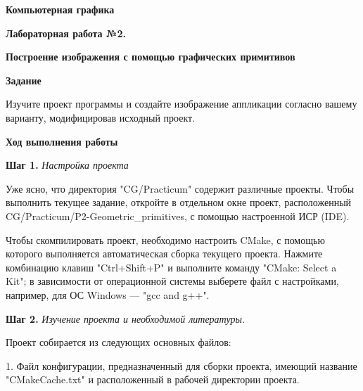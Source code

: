 \documentclass[a4paper,12pt]{article}
\begin{document}
\begin{center}
    \textbf{{\Large Компьютерная графика}}
    
    \textbf{{\large Лабораторная работа №2. }}
    
    \textbf{{\large Построение изображения с помощью графических примитивов}}
    \end{center}
    
    
    \textbf{Задание}
    
    Изучите проект программы и создайте изображение аппликации согласно вашему варианту, модифицировав исходный проект.
    
    
    
    \textbf{Ход выполнения работы}
    
    \textbf{Шаг 1.} \textit{Настройка проекта}
    
    Уже ясно, что директория "CG/Practicum" содержит различные проекты. Чтобы выполнить текущее задание, откройте в отдельном окне проект, расположенный CG/Practicum/P2-Geometric\_primitives, с помощью настроенной ИСР (IDE).

    Чтобы скомпилировать проект, необходимо настроить CMake, с помощью которого выполняется автоматическая сборка текущего проекта.
    Нажмите комбинацию клавиш "Ctrl+Shift+P" и выполните команду "CMake: Select a Kit"; в зависимости от операционной системы выберете файл с настройками, например, для ОС Windows --- "gcc and g++".


    
    
    
    \textbf{Шаг 2.} \textit{Изучение проекта и необходимой литературы.}
    
    Проект собирается из следующих основных файлов:
    
    1. Файл конфигурации, предназначенный для сборки проекта, имеющий название "CMakeCache.txt" и расположенный в рабочей директории проекта.
    
\end{document}
